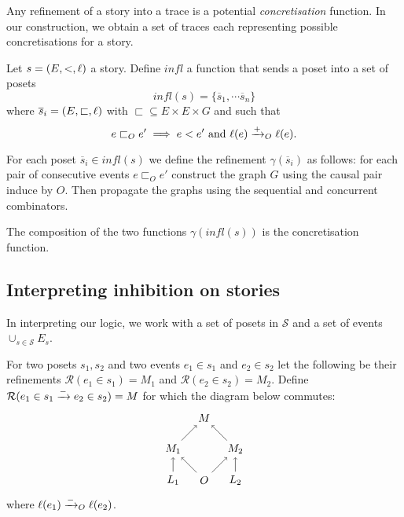 Any refinement of a story into a trace is a potential \emph{concretisation} function. In our construction, we obtain a set of traces each representing possible concretisations for a story.

\begin{definition}
  Let $s = (E,<,\ell)$ a story. Define $\textit{infl}$ a function that sends a poset into a set of posets
  \[
  \textit{infl}(s) =\{\overline{s}_1,\cdots\overline{s}_n\}
  \]
  where $\overline{s}_i = (E,\sqsubset,\ell)$ with $\sqsubset\subseteq E\times E\times G$ and such that
  \[
  e \sqsubset_O e' \implies e < e' \text{ and }\ell(e)\mathrel{\xrightarrow{+}}_O \ell(e).
  \]

  For each poset $\overline{s}_i\in\textit{infl}(s)$ we define the refinement $\gamma(\overline{s}_i)$ as follows: for each pair of consecutive events $e \sqsubset_O e'$ construct the graph $G$ using the causal pair induce by $O$. Then propagate the graphs using the sequential and concurrent combinators.

  The composition of the two functions $\gamma(\textit{infl}(s))$ is the concretisation function.
\end{definition}

\subsection{Interpreting inhibition on stories}

In interpreting our logic, we work with a set of posets in $\mathcal{S}$ and a set of events $\cup_{s\in\mathcal{S}} E_s$.

\begin{definition}
  For two posets $s_1,s_2$ and two events $e_1\in s_1$ and $e_2\in s_2$ let the following be their refinements $\mathcal{R}(e_1\in s_1) = M_1$ and $\mathcal{R}(e_2\in s_2) = M_2$. Define $\mathcal{R}(e_1\in s_1\mathrel{\xrightarrow{-}} e_2\in s_2) = M$ for which the diagram below commutes:
  \[
  \begin{tikzpicture} %
    \node (o) at (0,0) {\(O\)};
    \node (n) at (0,2) {\(M\)};
    \node (l1) at (-1,0) {\(L_1\)};
    \node (l2) at (1,0) {\(L_2\)};
    \node (n1) at (-1,1) {\(M_1\)};
    \node (n2) at (1,1) {\(M_2\)};
    \draw [->] (l1) -- (n1);
    \draw [->] (l2) -- (n2);
    \draw [->] (o) -- (n1);
    \draw [->] (o) -- (n2);
    \draw [->] (n1) -- (n);
    \draw [->] (n2) -- (n);
  \end{tikzpicture}
  \]
  where $\ell(e_1)\mathrel{\xrightarrow{-}}_O\ell(e_2)$.
\end{definition}
